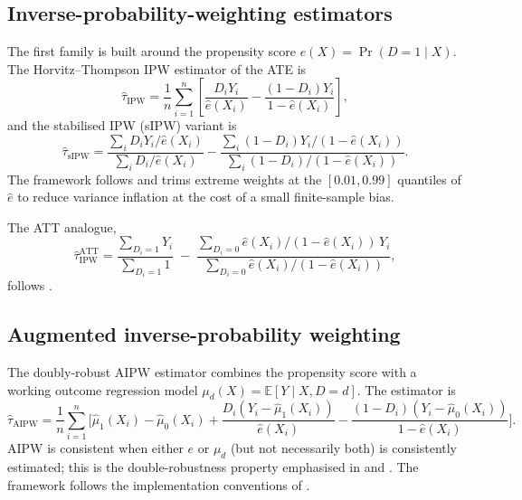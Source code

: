 \documentclass[article,shortnames,nojss]{jss}
\renewcommand{\E}{\mathbb{E}}
\begin{document}
\subsection{Inverse-probability-weighting estimators}
\label{sec:ipw}

The first family is built around the propensity score
$e(X) = \Pr(D=1 \mid X)$. The Horvitz--Thompson IPW estimator of
the ATE is
\begin{equation}
\label{eq:hipw}
\hat{\tau}_{\mathrm{IPW}} = \frac{1}{n} \sum_{i=1}^{n}
\left[
\frac{D_i Y_i}{\hat{e}(X_i)} -
\frac{(1-D_i) Y_i}{1-\hat{e}(X_i)}
\right],
\end{equation}
and the stabilised IPW (sIPW) variant is
\begin{equation}
\label{eq:sipw}
\hat{\tau}_{\mathrm{sIPW}} =
\frac{ \sum_{i} D_i Y_i / \hat{e}(X_i) }{ \sum_{i} D_i / \hat{e}(X_i) } -
\frac{ \sum_{i} (1-D_i) Y_i / (1-\hat{e}(X_i)) }{ \sum_{i} (1-D_i) / (1-\hat{e}(X_i)) }.
\end{equation}
The framework follows \citet{Cole2008} and trims extreme weights at
the $[0.01, 0.99]$ quantiles of $\hat{e}$ to reduce variance
inflation at the cost of a small finite-sample bias.

The ATT analogue,
\begin{equation}
\label{eq:att}
\hat{\tau}^{\mathrm{ATT}}_{\mathrm{IPW}} =
\frac{\sum_{D_i=1} Y_i}{\sum_{D_i=1} 1}
\;-\;
\frac{\sum_{D_i=0} \hat e(X_i)/(1-\hat e(X_i))\, Y_i}
     {\sum_{D_i=0} \hat e(X_i)/(1-\hat e(X_i))},
\end{equation}
follows \citet{ImbensRubin2015}.

\subsection{Augmented inverse-probability weighting}
\label{sec:aipw}

The doubly-robust AIPW estimator combines the propensity score with
a working outcome regression model $\mu_d(X) = \E[Y \mid X, D=d]$.
The estimator is
\begin{equation}
\label{eq:aipw}
\hat{\tau}_{\mathrm{AIPW}} = \frac{1}{n} \sum_{i=1}^{n}
\biggl[
\hat{\mu}_1(X_i) - \hat{\mu}_0(X_i)
+ \frac{D_i (Y_i - \hat{\mu}_1(X_i))}{\hat{e}(X_i)}
- \frac{(1-D_i) (Y_i - \hat{\mu}_0(X_i))}{1-\hat{e}(X_i)}
\biggr].
\end{equation}
AIPW is consistent when either $e$ or $\mu_d$ (but not necessarily
both) is consistently estimated; this is the double-robustness
property emphasised in \citet{Robins1994} and \citet{Bang2005}. The
framework follows the implementation conventions of
\citet{Funk2011}.
\end{document}
